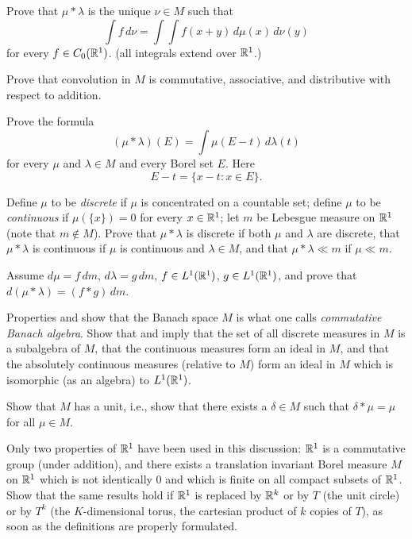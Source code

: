 \begin{enumerate}
\begin{excopy}
\begin{itemize}
Prove that \(\mu \ast \lambda \) is the unique \(\nu\in M\) such that 
\begin{equation*}
\int f\,d\nu = \int\int f(x+y)\,d\mu(x)\,d\nu(y)
\end{equation*}
for every \(f\in C_0(\mathbb{R}^1)\). (all integrals extend over \(\mathbb{R}^1\).)

Prove that convolution in $M$ is commutative, associative, and distributive
with respect to addition.

Prove the formula
\begin{equation*}
(\mu \ast \lambda)(E) = \int \mu(E-t)\,d\lambda(t)
\end{equation*}
for every \(\mu\) and \(\lambda \in M\) and every Borel set $E$. Here
\begin{equation*}
E - t = \{x - t: x\in E\}.
\end{equation*}

Define \(\mu\) to be 
\emph{discrete} 
if \(\mu\) is concentrated on a countable set;
define \(\mu\) to be 
\emph{continuous}
if \(\mu(\{x\}) = 0\) for every \(x\in\mathbb{R}^1\);
let $m$ be Lebesgue measure on \(\mathbb{R}^1\)
(note that \(m\notin M\)).
Prove that  \(\mu \ast \lambda\) is discrete if both \(\mu\) and \(\lambda\)
are discrete, that \(\mu \ast \lambda\) is continuous if \(\mu\) is continuous
and \(\lambda\in M\), and that \(\mu \ast \lambda \ll m \) if \(\mu \ll m\).

Assume
\(d\mu = f\,dm\), 
\(d\lambda = g\,dm\),
\(f\in L^1(\mathbb{R}^1)\), 
\(g\in L^1(\mathbb{R}^1)\), 
and prove that \\
\(d(\mu\ast\lambda) = (f\ast g)\,dm\).

Properties  and  show that the Banach space $M$ is what one calls
\emph{commutative Banach algebra}.
Show that  and  imply that the set of all discrete measures in $M$
is a subalgebra of $M$,
that the continuous measures form an ideal in $M$, and that the absolutely
continuous measures (relative to $M$) form an ideal in $M$ which is isomorphic 
(as an algebra) to \(L^1(\mathbb{R}^1)\).

Show that $M$ has a unit, i.e., show that there exists a \(\delta\in M\)
such that \(\delta \ast \mu = \mu\) for all \(\mu \in M\).

Only two properties of \(\mathbb{R}^1\) have been used in this discussion: \(\mathbb{R}^1\)
is a commutative group (under addition), and there exists a translation
invariant Borel measure $M$ on \(\mathbb{R}^1\) which is not identically $0$ and 
which is finite on all compact subsets of \(\mathbb{R}^1\).
Show that the same results hold if \(\mathbb{R}^1\)
is replaced by \(\mathbb{R}^k\) or by $T$ (the unit circle) or by \(T^k\)
(the $K$-dimensional torus, the cartesian product of $k$
copies of $T$),
as soon as the definitions are properly formulated.
\end{itemize}
\end{excopy}


\end{enumerate}
